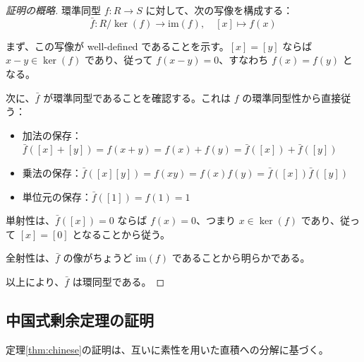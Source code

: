 \documentclass[uplatex, a4paper]{jlreq}
\theoremstyle{definition}
\begin{document}
\begin{proof}[証明の概略]
環準同型 $f: R \to S$ に対して、次の写像を構成する：
\[
\bar{f}: R/\ker(f) \to \mathrm{im}(f), \quad [x] \mapsto f(x)
\]

まず、この写像が well-defined であることを示す。$[x] = [y]$ ならば $x - y \in \ker(f)$ であり、従って $f(x - y) = 0$、すなわち $f(x) = f(y)$ となる。

次に、$\bar{f}$ が環準同型であることを確認する。これは $f$ の環準同型性から直接従う：
\begin{itemize}
\item 加法の保存：$\bar{f}([x] + [y]) = f(x + y) = f(x) + f(y) = \bar{f}([x]) + \bar{f}([y])$
\item 乗法の保存：$\bar{f}([x][y]) = f(xy) = f(x)f(y) = \bar{f}([x])\bar{f}([y])$
\item 単位元の保存：$\bar{f}([1]) = f(1) = 1$
\end{itemize}

単射性は、$\bar{f}([x]) = 0$ ならば $f(x) = 0$、つまり $x \in \ker(f)$ であり、従って $[x] = [0]$ となることから従う。

全射性は、$\bar{f}$ の像がちょうど $\mathrm{im}(f)$ であることから明らかである。

以上により、$\bar{f}$ は環同型である。
\end{proof}

\subsection{中国式剰余定理の証明}

定理\ref{thm:chinese}の証明は、互いに素性を用いた直積への分解に基づく。
\end{document}
